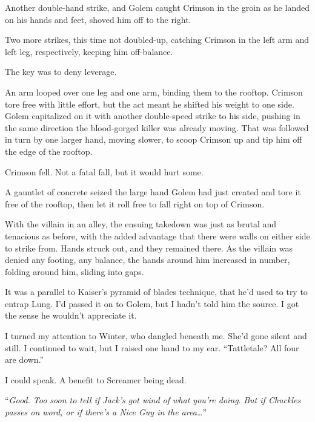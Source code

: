 Another double-hand strike, and Golem caught Crimson in the groin as he landed on his hands and feet, shoved him off to the right.



Two more strikes, this time not doubled-up, catching Crimson in the left arm and left leg, respectively, keeping him off-balance.



The key was to deny leverage.



An arm looped over one leg and one arm, binding them to the rooftop.  Crimson tore free with little effort, but the act meant he shifted his weight to one side.  Golem capitalized on it with another double-speed strike to his side, pushing in the same direction the blood-gorged killer was already moving.  That was followed in turn by one larger hand, moving slower, to scoop Crimson up and tip him off the edge of the rooftop.



Crimson fell.  Not a fatal fall, but it would hurt some.



A gauntlet of concrete seized the large hand Golem had just created and tore it free of the rooftop, then let it roll free to fall right on top of Crimson.



With the villain in an alley, the ensuing takedown was just as brutal and tenacious as before, with the added advantage that there were walls on either side to strike from.  Hands struck out, and they remained there.  As the villain was denied any footing, any balance, the hands around him increased in number, folding around him, sliding into gaps.



It was a parallel to Kaiser's pyramid of blades technique, that he'd used to try to entrap Lung.  I'd passed it on to Golem, but I hadn't told him the source.  I got the sense he wouldn't appreciate it.



I turned my attention to Winter, who dangled beneath me.  She'd gone silent and still.  I continued to wait, but I raised one hand to my ear.  ``Tattletale?  All four are down.''



I could speak.  A benefit to Screamer being dead.



``\emph{Good.  Too soon to tell if Jack's got wind of what you're doing}.  \emph{But if Chuckles passes on word, or if there's a Nice Guy in the area\ldots}''



